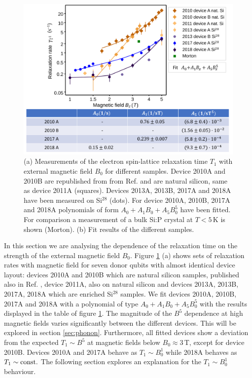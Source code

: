 \documentclass[%
 reprint,
 amsmath,amssymb,
 aps,
]{revtex4-1}
\begin{document}
\begin{figure}
\centering
\includegraphics[width=\columnwidth]{figures/fig3.pdf}
\caption{(a) Measurements of the electron spin-lattice relaxation time $T_1$ with external magnetic field $B_0$ for different samples. Device 2010A and 2010B are republished from from Ref. \cite{Morello2010} and are natural silicon, same as device 2011A (squares). Devices 2013A, 2013B, 2017A and 2018A have been measured on Si$^{28}$ (dots). For device 2010A, 2010B, 2017A and 2018A polynomials of form $A_0+A_1B_0+A_5B_0^5$ have been fitted. For comparison a measurement of a bulk Si:P crystal at $T<5\,$K is shown (Morton). (b) Fit results of the different samples. 
}
\label{fig:magnetic field dependence}
\end{figure}


In this section we are analysing the dependence of the relaxation time on the strength of the external magnetic field $B_0$. Figure \ref{fig:magnetic field dependence} (a) shows sets of relaxation rates with magnetic field for seven donor qubits with almost identical device layout: devices 2010A and 2010B which are  natural silicon samples, published also in Ref. \cite{Morello2010},
device 2011A, also on natural silicon and devices 2013A, 2013B, 2017A, 2018A which are enriched Si$^{28}$ samples. We fit devices 2010A, 2010B, 2017A and 2018A with a polynomial of type $A_0+A_1B_0+A_5B_0^5$ with the results displayed in the table of figure \ref{fig:magnetic field dependence}.  The magnitude of the $B^5$ dependence at high magnetic fields varies significantly between the different devices. This will be explored in section \ref{sec:phonon}.
Furthermore, all fitted devices show a deviation from the expected $T_1\sim B^5$ at magnetic fields below $B_0\approx3\,$T, except for device 2010B. Devices 2010A and 2017A behave as $T_1\sim B_0^1$ while 2018A behaves as $T_1\sim \rm{const.}$ The following section explores an explanation for the $T_1\sim B_0^1$ behaviour.
\end{document}
